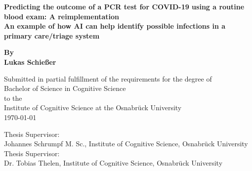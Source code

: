 \begin{titlepage}
	\begin{center}
		\vspace*{1cm}
		\Huge
		\textbf{Predicting the outcome of a PCR test for COVID-19 using a 
routine blood exam: A reimplementation \\} 
		\vspace{0.5cm}
		\Large
		\textbf{An example of how AI can help identify possible infections in a 
primary care/triage system}
		
		\vspace{1cm}
		
		\textbf{By \\ Lukas Schießer}
		
		\vspace{1cm}
		\small
		Submitted in partial fulfillment of the requirements for the degree of \\
		Bachelor of Science in Cognitive Science \\ to the \\
		Institute of Cognitive Science at the Osnabrück University\\
		\today
		
		\vfill
		\vspace{1cm}
		Thesis Supervisor:\\ Johannes Schrumpf M. Sc., Institute of Cognitive 
Science, Osnabrück University \\
		Thesis Supervisor:\\   Dr. Tobias Thelen, Institute of Cognitive 
Science, Osnabrück University
		
		
		
	\end{center}
\end{titlepage}
